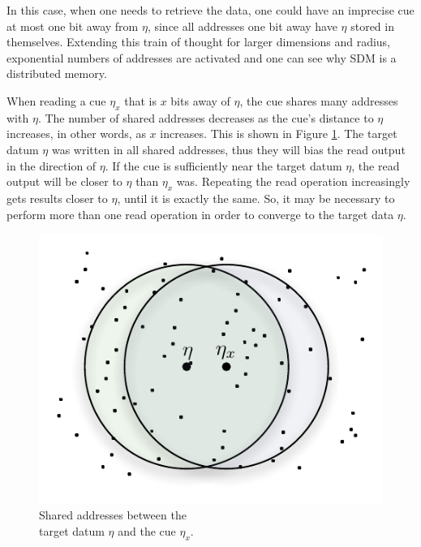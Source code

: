 In this case, when one needs to retrieve the data, one could have an imprecise cue at most one bit away from $\eta$, since all addresses one bit away have $\eta$ stored in themselves.  Extending this train of thought for larger dimensions and radius, exponential numbers of addresses are activated and one can see why SDM is a distributed memory.

When reading a cue $\eta_{x}$ that is $x$ bits away of $\eta$, the cue shares many addresses with $\eta$. The number of shared addresses decreases as the cue's distance to $\eta$ increases, in other words, as $x$ increases. This is shown in Figure \ref{fig-shared-addresses}.  The target datum $\eta$ was written in all shared addresses, thus they will bias the read output in the direction of $\eta$. If the cue is sufficiently near the target datum $\eta$, the read output will be closer to $\eta$ than $\eta_{x}$ was. Repeating the read operation increasingly gets results closer to $\eta$, until it is exactly the same. So, it may be necessary to perform more than one read operation in order to converge to the target data $\eta$.

\begin{figure}[!htb]
\centering\includegraphics[scale=0.75]{./images02/p1_inter_p2.pdf}

\caption{Shared addresses between the \protect \\
target datum $\eta$ and the cue $\eta_{x}$. \label{fig-shared-addresses}}
\end{figure}


